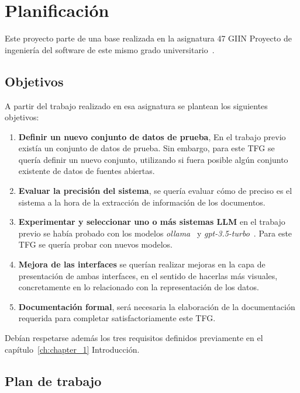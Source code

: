 \section{Planificación}\label{sec:desarrollo_de_software}

Este proyecto parte de una base realizada en la asignatura 47 GIIN Proyecto de ingeniería del
software de este mismo grado universitario~\cite{url_viu_47_proyecto}.

\subsection*{Objetivos}

A partir del trabajo realizado en esa asignatura se plantean los siguientes objetivos:

\begin{enumerate}
    \item \textbf{Definir un nuevo conjunto de datos de prueba},
    En el trabajo previo existía un conjunto de datos de prueba.
    Sin embargo, para este TFG se quería definir un nuevo conjunto, utilizando si fuera posible algún conjunto existente
    de datos de fuentes abiertas.
    \item \textbf{Evaluar la precisión del sistema},
    se quería evaluar cómo de preciso es el sistema a la hora de la extracción de información de los documentos.
    \item \textbf{Experimentar y seleccionar uno o más sistemas LLM}
    en el trabajo previo se había probado con los modelos \textit{ollama}~\cite{url_ollama} y
    \textit{gpt-3.5-turbo}~\cite{url_openai_gpt3_5}.
    Para este TFG se quería probar con nuevos modelos.
    \item \textbf{Mejora de las interfaces}
    se querían realizar mejoras en la capa de presentación de ambas interfaces, en el sentido de hacerlas más
    visuales, concretamente en lo relacionado con la representación de los datos.
    \item \textbf{Documentación formal},
    será necesaria la elaboración de la documentación requerida para completar satisfactoriamente este TFG.
\end{enumerate}

Debían respetarse además los tres requisitos definidos previamente en el capítulo~\ref{ch:chapter_1} Introducción.

\subsection*{Plan de trabajo}

